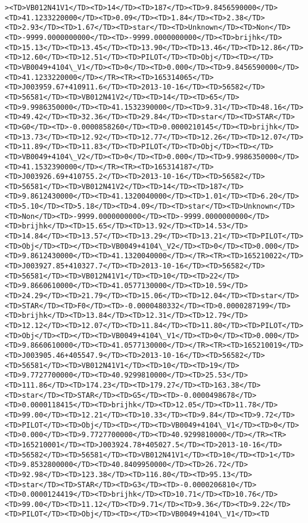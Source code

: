 \documentclass[11pt]{article}
\begin{document}
\begin{Verbatim}[commandchars=\\\{\}]
><TD>VB012N41V1</TD><TD>14</TD><TD>187</TD><TD>9.8456590000</TD><TD>41.1233220000</TD><TD>0.09</TD><TD>1.84</TD><TD>2.38</TD><TD>2.93</TD><TD>1.67</TD><TD>star</TD><TD>Unknown</TD><TD>Non</TD><TD>-9999.0000000000</TD><TD>-9999.0000000000</TD><TD>brijhk</TD><TD>15.13</TD><TD>13.45</TD><TD>13.90</TD><TD>13.46</TD><TD>12.86</TD><TD>12.60</TD><TD>12.51</TD><TD>PILOT</TD><TD>Obj</TD><TD></TD><TD>VB0049+4104\_V1</TD><TD>0</TD><TD>0.000</TD><TD>9.8456590000</TD><TD>41.1233220000</TD></TR><TR><TD>165314065</TD><TD>J003959.67+410911.6</TD><TD>2013-10-16</TD><TD>56582</TD><TD>56581</TD><TD>VB012N41V2</TD><TD>14</TD><TD>65</TD><TD>9.9986350000</TD><TD>41.1532390000</TD><TD>9.31</TD><TD>48.16</TD><TD>49.42</TD><TD>32.36</TD><TD>29.84</TD><TD>star</TD><TD>STAR</TD><TD>G0</TD><TD>-0.0000858260</TD><TD>0.0000210145</TD><TD>brijhk</TD><TD>13.73</TD><TD>12.92</TD><TD>12.77</TD><TD>12.26</TD><TD>12.07</TD><TD>11.89</TD><TD>11.83</TD><TD>PILOT</TD><TD>Obj</TD><TD></TD><TD>VB0049+4104\_V2</TD><TD>0</TD><TD>0.000</TD><TD>9.9986350000</TD><TD>41.1532390000</TD></TR><TR><TD>165314187</TD><TD>J003926.69+410755.2</TD><TD>2013-10-16</TD><TD>56582</TD><TD>56581</TD><TD>VB012N41V2</TD><TD>14</TD><TD>187</TD><TD>9.8612430000</TD><TD>41.1320040000</TD><TD>1.01</TD><TD>6.20</TD><TD>5.10</TD><TD>5.18</TD><TD>4.09</TD><TD>star</TD><TD>Unknown</TD><TD>Non</TD><TD>-9999.0000000000</TD><TD>-9999.0000000000</TD><TD>brijhk</TD><TD>15.65</TD><TD>13.92</TD><TD>14.53</TD><TD>14.84</TD><TD>13.57</TD><TD>13.29</TD><TD>13.21</TD><TD>PILOT</TD><TD>Obj</TD><TD></TD><TD>VB0049+4104\_V2</TD><TD>0</TD><TD>0.000</TD><TD>9.8612430000</TD><TD>41.1320040000</TD></TR><TR><TD>165210022</TD><TD>J003927.85+410327.7</TD><TD>2013-10-16</TD><TD>56582</TD><TD>56581</TD><TD>VB012N41V1</TD><TD>10</TD><TD>22</TD><TD>9.8660610000</TD><TD>41.0577130000</TD><TD>10.59</TD><TD>24.29</TD><TD>21.79</TD><TD>15.06</TD><TD>12.04</TD><TD>star</TD><TD>STAR</TD><TD>F0</TD><TD>-0.0000480332</TD><TD>0.0000287199</TD><TD>brijhk</TD><TD>13.84</TD><TD>12.31</TD><TD>12.79</TD><TD>12.12</TD><TD>12.07</TD><TD>11.84</TD><TD>11.80</TD><TD>PILOT</TD><TD>Obj</TD><TD></TD><TD>VB0049+4104\_V1</TD><TD>0</TD><TD>0.000</TD><TD>9.8660610000</TD><TD>41.0577130000</TD></TR><TR><TD>165210019</TD><TD>J003905.46+405547.9</TD><TD>2013-10-16</TD><TD>56582</TD><TD>56581</TD><TD>VB012N41V1</TD><TD>10</TD><TD>19</TD><TD>9.7727700000</TD><TD>40.9299810000</TD><TD>25.53</TD><TD>111.86</TD><TD>174.23</TD><TD>179.27</TD><TD>163.38</TD><TD>star</TD><TD>STAR</TD><TD>G5</TD><TD>-0.0000498678</TD><TD>0.0000118415</TD><TD>brijhk</TD><TD>12.05</TD><TD>11.78</TD><TD>99.00</TD><TD>12.21</TD><TD>10.33</TD><TD>9.84</TD><TD>9.72</TD><TD>PILOT</TD><TD>Obj</TD><TD></TD><TD>VB0049+4104\_V1</TD><TD>0</TD><TD>0.000</TD><TD>9.7727700000</TD><TD>40.9299810000</TD></TR><TR><TD>165210001</TD><TD>J003924.78+405027.5</TD><TD>2013-10-16</TD><TD>56582</TD><TD>56581</TD><TD>VB012N41V1</TD><TD>10</TD><TD>1</TD><TD>9.8532800000</TD><TD>40.8409950000</TD><TD>26.72</TD><TD>92.98</TD><TD>123.38</TD><TD>116.80</TD><TD>95.13</TD><TD>star</TD><TD>STAR</TD><TD>G3</TD><TD>-0.0000206810</TD><TD>0.0000124419</TD><TD>brijhk</TD><TD>10.71</TD><TD>10.76</TD><TD>99.00</TD><TD>11.12</TD><TD>9.71</TD><TD>9.36</TD><TD>9.22</TD><TD>PILOT</TD><TD>Obj</TD><TD></TD><TD>VB0049+4104\_V1</TD><TD
\end{Verbatim}
\end{document}
